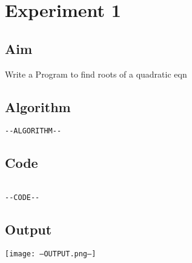 \section*{Experiment 1 }


\vspace{20px}
\subsection{Aim}
Write a Program to find roots of a quadratic eqn
\subsection{Algorithm}
\begin{verbatim}
--ALGORITHM--
\end{verbatim}
\newpage

\subsection{Code}
\begin{lstlisting}[label={list:first}]

--CODE--

\end{lstlisting}
\subsection{Output}
\texttt{[image: --OUTPUT.png--]}

\newpage
